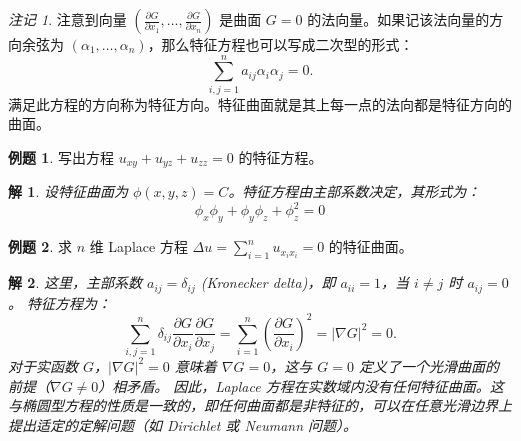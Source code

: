 \documentclass[12pt,a4paper]{article}
\numberwithin{subsection}{section}   %
\numberwithin{subsubsection}{subsection}
\theoremstyle{plain}
\newtheorem{solution}{解}[subsection]  %
\theoremstyle{definition}
\newtheorem{example}{例题}[subsection]  %
\theoremstyle{remark}
\newtheorem{remark}[theorem]{注记}
\theoremstyle{remark}
\begin{document}
	\begin{remark}
		注意到向量 \((\frac{\partial G}{\partial x_1}, \dots, \frac{\partial G}{\partial x_n})\) 是曲面 \(G=0\) 的法向量。如果记该法向量的方向余弦为 \((\alpha_1, \dots, \alpha_n)\)，那么特征方程也可以写成二次型的形式：
		\[
		\sum_{i,j=1}^{n} a_{ij} \alpha_i \alpha_j = 0.
		\]
		满足此方程的方向称为特征方向。特征曲面就是其上每一点的法向都是特征方向的曲面。
	\end{remark}
	
	
		\begin{example}
		写出方程 $u_{xy} + u_{yz} + u_{zz} = 0$ 的特征方程。
	\end{example}
	\begin{solution}
		设特征曲面为 $\phi(x, y, z) = C$。特征方程由主部系数决定，其形式为：
		\[
		\phi_x \phi_y + \phi_y \phi_z + \phi_z^2 = 0
		\]
	\end{solution}
	
	
	\begin{example}
		求 \(n\) 维 Laplace 方程 \(\Delta u = \sum_{i=1}^n u_{x_ix_i} = 0\) 的特征曲面。
	\end{example}
	\begin{solution}
		这里，主部系数 \(a_{ij} = \delta_{ij}\) (Kronecker delta)，即 \(a_{ii}=1\)，当 \(i \neq j\) 时 \(a_{ij}=0\)。
		特征方程为：
		\[
		\sum_{i,j=1}^{n} \delta_{ij} \frac{\partial G}{\partial x_i} \frac{\partial G}{\partial x_j} = \sum_{i=1}^{n} \left(\frac{\partial G}{\partial x_i}\right)^2 = |\nabla G|^2 = 0.
		\]
		对于实函数 \(G\)，\(|\nabla G|^2=0\) 意味着 \(\nabla G = 0\)，这与 \(G=0\) 定义了一个光滑曲面的前提（\(\nabla G \neq 0\)）相矛盾。
		因此，Laplace 方程在实数域内没有任何特征曲面。这与椭圆型方程的性质是一致的，即任何曲面都是非特征的，可以在任意光滑边界上提出适定的定解问题（如 Dirichlet 或 Neumann 问题）。
	\end{solution}
	
	
	
	
	
	
\end{document}
